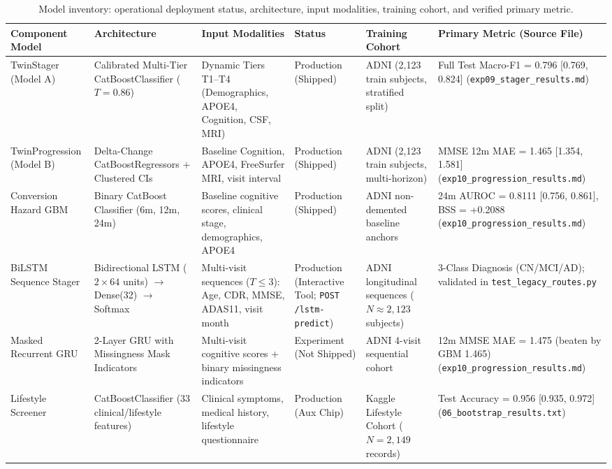 \begin{table}[t]
\centering
\caption{Model inventory: operational deployment status, architecture, input modalities, training cohort, and verified primary metric.}
\label{tab:model_inventory}
\small
\begin{adjustbox}{max width=\linewidth}
\begin{tabular}{p{2.3cm}p{3.0cm}p{2.6cm}p{2.0cm}p{2.2cm}p{3.0cm}}
\toprule
\textbf{Component Model} & \textbf{Architecture} & \textbf{Input Modalities} & \textbf{Status} & \textbf{Training Cohort} & \textbf{Primary Metric (Source File)} \\
\midrule
TwinStager (Model A) & Calibrated Multi-Tier CatBoostClassifier ($T=0.86$) & Dynamic Tiers T1--T4 (Demographics, APOE4, Cognition, CSF, MRI) & Production (Shipped) & ADNI (2,123 train subjects, stratified split) & Full Test Macro-F1 = 0.796 [0.769, 0.824] (\texttt{exp09\_stager\_results.md}) \\
TwinProgression (Model B) & Delta-Change CatBoostRegressors + Clustered CIs & Baseline Cognition, APOE4, FreeSurfer MRI, visit interval & Production (Shipped) & ADNI (2,123 train subjects, multi-horizon) & MMSE 12m MAE = 1.465 [1.354, 1.581] (\texttt{exp10\_progression\_results.md}) \\
Conversion Hazard GBM & Binary CatBoost Classifier (6m, 12m, 24m) & Baseline cognitive scores, clinical stage, demographics, APOE4 & Production (Shipped) & ADNI non-demented baseline anchors & 24m AUROC = 0.8111 [0.756, 0.861], BSS = +0.2088 (\texttt{exp10\_progression\_results.md}) \\
BiLSTM Sequence Stager & Bidirectional LSTM ($2 \times 64$ units) $\rightarrow$ Dense(32) $\rightarrow$ Softmax & Multi-visit sequences ($T \le 3$): Age, CDR, MMSE, ADAS11, visit month & Production (Interactive Tool; \texttt{POST /lstm-predict}) & ADNI longitudinal sequences ($N \approx 2{,}123$ subjects) & 3-Class Diagnosis (CN/MCI/AD); validated in \texttt{test\_legacy\_routes.py} \\
Masked Recurrent GRU & 2-Layer GRU with Missingness Mask Indicators & Multi-visit cognitive scores + binary missingness indicators & Experiment (Not Shipped) & ADNI 4-visit sequential cohort & 12m MMSE MAE = 1.475 (beaten by GBM 1.465) (\texttt{exp10\_progression\_results.md}) \\
Lifestyle Screener & CatBoostClassifier (33 clinical/lifestyle features) & Clinical symptoms, medical history, lifestyle questionnaire & Production (Aux Chip) & Kaggle Lifestyle Cohort ($N=2,149$ records) & Test Accuracy = 0.956 [0.935, 0.972] (\texttt{06\_bootstrap\_results.txt}) \\

\end{tabular}
\end{adjustbox}
\end{table}
